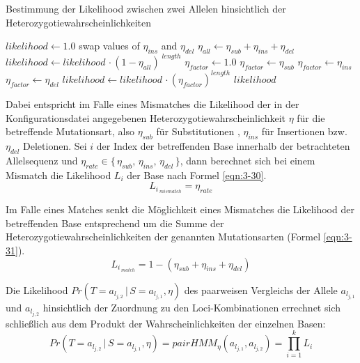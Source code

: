 \begin{algorithm}[H]
	\caption{Bestimmung der Likelihood zwischen zwei Allelen hinsichtlich der Heterozygotiewahrscheinlichkeiten}  \label{alg:lh_het}
	\begin{algorithmic}[1]	
		\State $likelihood \gets 1.0$
		\State swap values of $\eta_{ins}$ and $\eta_{del}$
		\EndIf
		\State $\eta_{all} \gets \eta_{sub}+\eta_{ins}+\eta_{del}$
		\State $ likelihood \gets likelihood \, \cdotp (1 - \eta_{all})^{\;length} $
		\EndIf		    
		\State $ \eta_{factor} \gets 1.0$			    	
		\State $\eta_{factor} \gets \eta_{sub}$
		\EndIf	
		\State $\eta_{factor} \gets \eta_{ins}$
		\EndIf
		\State $\eta_{factor} \gets \eta_{del}$
		\EndIf
		\State $ likelihood \gets likelihood \, \cdotp (\eta_{factor})^{length}$
		\EndIf
		\EndFor
		\State \Return $ likelihood $
		\EndFunction
	\end{algorithmic}
\end{algorithm}

Dabei entspricht im Falle eines Mismatches die Likelihood der in der Konfigurationsdatei angegebenen Heterozygotiewahrscheinlichkeit $ \eta $ für die betreffende Mutationsart, also $ \eta_{sub} $ für Substitutionen , $ \eta_{ins} $ für Insertionen bzw. $ \eta_{del} $ Deletionen. Sei $i$ der Index der betreffenden Base innerhalb der betrachteten Allelsequenz und $ \eta_{rate} \in \{\,\eta_{sub},\, \eta_{ins},\, \eta_{del}\,\}$, dann berechnet sich bei einem Mismatch die Likelihood $L_{i}$ der Base nach Formel \eqref{eqn:3-30}.
\begin{equation} \label{eqn:3-30}
\tag{3-30}
L_{i\,_{mismatch}} = \eta_{rate}
\end{equation}

Im Falle eines Matches senkt die Möglichkeit eines Mismatches die Likelihood der betreffenden Base entsprechend um die Summe der Heterozygotiewahrscheinlichkeiten der genannten Mutationsarten (Formel \eqref{eqn:3-31}).
\begin{equation} \label{eqn:3-31}
\tag{3-31}
L_{i\,_{match}} = 1 - (\eta_{sub} + \eta_{ins} + \eta_{del})
\end{equation}

Die Likelihood $ Pr(T=a_{l_{j,2}} \, | \, S=a_{l_{j,1}}, \eta) $ des paarweisen Vergleichs der Allele $a_{l_{j,1}}$ und $a_{l_{j,2}}$ hinsichtlich der Zuordnung zu den Loci-Kombinationen errechnet sich schließlich aus dem Produkt der Wahrscheinlichkeiten der einzelnen Basen:
\begin{equation} \label{eqn:3-32}
\tag{3-32}
Pr(T=a_{l_{j,2}} \, | \, S=a_{l_{j,1}}, \eta) = pairHMM_{\eta}(a_{l_{j,1}}, a_{l_{j,2}}) = \prod_{i=1}^{k}L_{i}
\end{equation}


